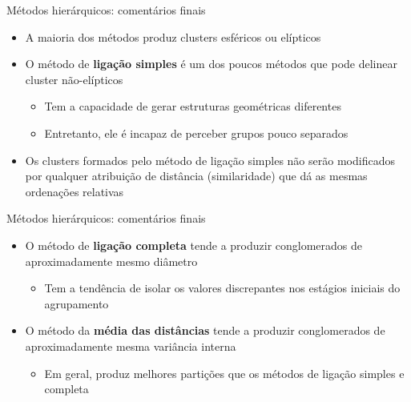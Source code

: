 \documentclass[
  ignorenonframetext,
  aspectratio=169,
]{beamer}
\providecommand{\tightlist}{%
  \setlength{\itemsep}{0pt}\setlength{\parskip}{0pt}}
\begin{document}
\begin{frame}{Métodos hierárquicos: comentários finais}
\protect{}\label{muxe9todos-hieruxe1rquicos-comentuxe1rios-finais-1}
\begin{itemize}
\tightlist
\item
  A maioria dos métodos produz clusters esféricos ou elípticos
\end{itemize}

\pause

\begin{itemize}
\tightlist
\item
  O método de \textbf{ligação simples} é um dos poucos métodos que pode
  delinear cluster não-elípticos

  \begin{itemize}
  \tightlist
  \item
    Tem a capacidade de gerar estruturas geométricas diferentes
  \item
    Entretanto, ele é incapaz de perceber grupos pouco separados
  \end{itemize}
\end{itemize}

\pause

\begin{itemize}
\tightlist
\item
  Os clusters formados pelo método de ligação simples não serão
  modificados por qualquer atribuição de distância (similaridade) que dá
  as mesmas ordenações relativas
\end{itemize}
\end{frame}

\begin{frame}{Métodos hierárquicos: comentários finais}
\protect{}\label{muxe9todos-hieruxe1rquicos-comentuxe1rios-finais-2}
\begin{itemize}
\tightlist
\item
  O método de \textbf{ligação completa} tende a produzir conglomerados
  de aproximadamente mesmo diâmetro

  \begin{itemize}
  \tightlist
  \item
    Tem a tendência de isolar os valores discrepantes nos estágios
    iniciais do agrupamento
  \end{itemize}
\end{itemize}

\pause

\begin{itemize}
\tightlist
\item
  O método da \textbf{média das distâncias} tende a produzir
  conglomerados de aproximadamente mesma variância interna

  \begin{itemize}
  \tightlist
  \item
    Em geral, produz melhores partições que os métodos de ligação
    simples e completa
  \end{itemize}
\end{itemize}
\end{frame}
\end{document}

